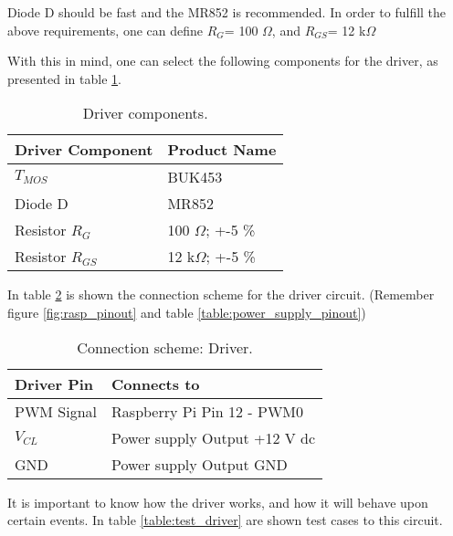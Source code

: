 Diode D should be fast and the MR852 is recommended.
In order to fulfill the above requirements, one can define \(R_{G}\)= 100 $\Omega$, and \(R_{GS}\)= 12 k$\Omega$  \linebreak

With this in mind, one can select the following components for the driver, as presented in table \ref{table:driver_components}.

\begin{table}[H]
	\centering
		\begin{tabular}{|m{5cm}|m{6cm}|}
			\hline
			\textbf{Driver Component} & \textbf{Product Name}
			\\\hline\hline
			
			\(T_{MOS}\) & BUK453
			\\\hline
			Diode D & MR852
			\\\hline
			Resistor \(R_{G}\) & 100 $\Omega$; +-5 \%
			\\\hline
			Resistor \(R_{GS}\) & 12 k$\Omega$; +-5 \%
			\\\hline
		\end{tabular}
	\caption{Driver components.}
	\label{table:driver_components}
\end{table}

In table \ref{table:connect_driver} is shown the connection scheme for the driver circuit. (Remember figure \ref{fig:rasp_pinout} and table \ref{table:power_supply_pinout})

\begin{table}[H]
	\centering
	\begin{tabular}{|m{5cm}|m{6cm}|}
		\hline
		\textbf{Driver Pin} & \textbf{Connects to}
		\\\hline\hline
		
		PWM Signal & Raspberry Pi Pin 12 - PWM0
		\\\hline
		\(V_{CL}\) & Power supply Output +12 V \ac{dc}
		\\\hline
		GND & Power supply Output GND
		\\\hline
	\end{tabular}
	
	\caption{Connection scheme: Driver.}
	\label{table:connect_driver}
\end{table}

It is important to know how the driver works, and how it will behave upon certain events. In table \ref{table:test_driver} are shown test cases to this circuit.

